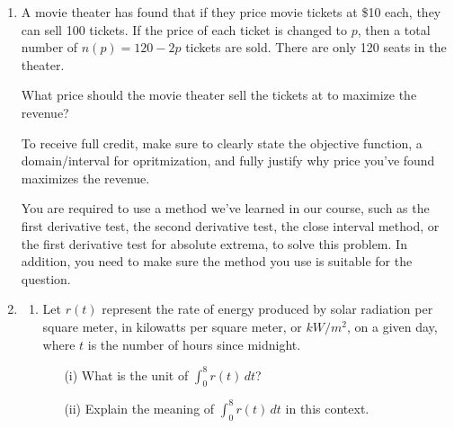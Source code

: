 \documentclass[11pt]{article}
\begin{document}
\begin{enumerate}
\newpage


\item A movie theater has found that if they price movie tickets at \$10 each, they can sell 100 tickets. If the price of each ticket is changed to $p$, then a total number of $n(p)=120-2p$ tickets are sold. There are only 120 seats in the theater.
 
What price should the movie theater sell the tickets at to maximize the revenue?

To receive full credit, make sure to clearly state the objective function, a domain/interval for opritmization, and fully justify why price you've found maximizes the revenue. 

You are required to use a method we've learned in our course, such as the first derivative test, the second derivative test, the close interval method, or the first derivative test for absolute extrema, to solve this problem. In addition, you need to make sure the method you use is suitable for the question.


\newpage


\item 

\begin{enumerate}
    \item Let $r(t)$ represent the rate of energy produced by solar radiation per square meter, in kilowatts per square meter, or $kW/m^2$, on a given day, where $t$ is the number of hours since midnight.

    \begin{enumerate}
        \item[(i)] What is the unit of $\displaystyle\int_0^8 r(t)\, dt$?

        \vfill

        \item[(ii)] Explain the meaning of $\displaystyle\int_0^8 r(t)\, dt$ in this context.


\end{enumerate}
\end{enumerate}
\end{enumerate}
\end{document}
